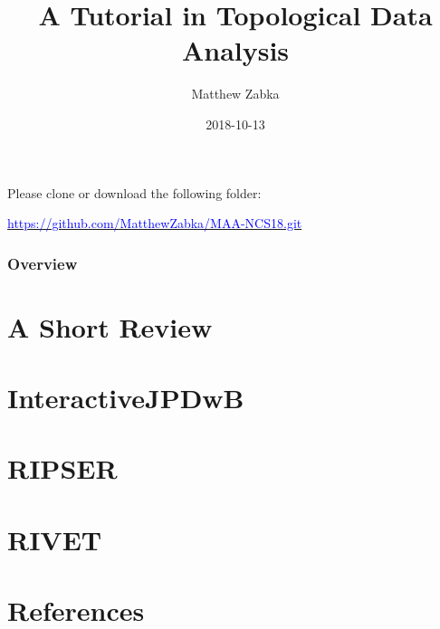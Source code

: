 \documentclass[handout]{beamer}
\title{A Tutorial in Topological Data Analysis} %
\author{Matthew Zabka}
\institute[SMSU] %
{
}
\date{2018-10-13} %
\begin{document}
\begin{frame}
\titlepage %
Please clone or download the following folder:
\begin{center}
\hyperref[https://github.com/MatthewZabka/MAA-NCS18.git]{\textcolor{blue}{https://github.com/MatthewZabka/MAA-NCS18.git}}
\end{center}
\end{frame}
\begin{frame}
\frametitle{Overview} %
\tableofcontents 
\end{frame}
\section{A Short Review}
%
\section{InteractiveJPDwB}
%
\section{RIPSER}
%
\section{RIVET}

\section{References}
\begin{frame}


\end{frame}
\end{document}
